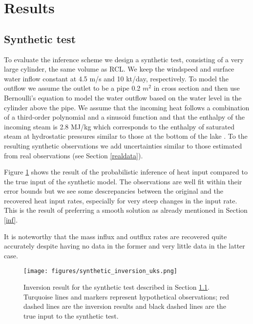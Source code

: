 \documentclass{bmcart}
\begin{document}
\section{Results}
\subsection{Synthetic test}\label{syn_test} 

To evaluate the inference scheme we design a synthetic test, consisting of a
very large cylinder, the same volume as RCL. We keep the windspeed and surface
water inflow constant at 4.5 m/s and 10 kt/day, respectively. To model the
outflow we assume the outlet to be a pipe 0.2 $m^2$ in cross section and then
use Bernoulli's equation to model the water outflow based on the water level in
the cylinder above the pipe. We assume that the incoming heat follows a
combination of a third-order polynomial and a sinusoid function and that the
enthalpy of the incoming steam is 2.8 MJ/kg which corresponds to the enthalpy of
saturated steam at hydrostatic pressures similar to those at the bottom of the
lake \cite{Mayhew1978}. To the resulting synthetic observations we add
uncertainties similar to those estimated from real observations (see Section
\ref{realdata}).

Figure \ref{syn_example} shows the result of the probabilistic inference of
heat input compared to the true input of the synthetic model. The observations
are well fit within their error bounds but we see some descrepancies between
the original and the recovered heat input rates, especially for very steep
changes in the input rate. This is the result of preferring a smooth solution
as already mentioned in Section \ref{inf}.

It is noteworthy that the mass influx and outflux rates are recovered
quite accurately despite having no data in the former and very little data
in the latter case.

\begin{figure}
	\texttt{[image: figures/synthetic\_inversion\_uks.png]}  
    \caption{Inversion result for the synthetic test described in Section 
        \ref{syn_test}. Turquoise lines and markers represent hypothetical
        observations; red dashed lines are the inversion results and black
        dashed lines are the true input to the synthetic test.}
  \label{syn_example}
\end{figure}
\end{document}
